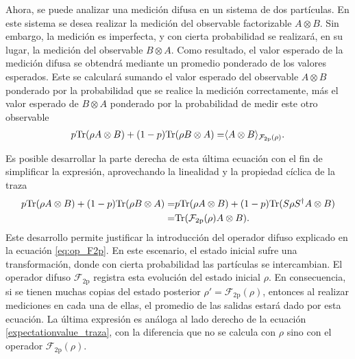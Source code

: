 

Ahora, se puede analizar una medición difusa en un sistema
de dos partículas. En este sistema se desea realizar la medición del observable factorizable $A\otimes B$. Sin embargo, la medición es imperfecta, y con cierta probabilidad se realizará, en su lugar, la medición del observable $B\otimes A$. Como resultado, el valor esperado de la medición difusa se obtendrá mediante un promedio ponderado de los valores esperados. Este se calculará sumando el valor esperado del observable $A\otimes B$ ponderado por la probabilidad que se realice la medición correctamente, más el valor esperado de $B\otimes A$ ponderado por la probabilidad de medir este otro observable {\cite{Pineda_2021}}\begin{equation}\label{eq:Expected-Value-FM-2p}
    \begin{split}
         p{\rm Tr}(\rho A\otimes B)+(1-p){\rm Tr}(\rho B\otimes A)=&\langle {A\otimes B}\rangle_{\mathcal{F}_{2\text{p}}(\rho)}.\\
    \end{split}
\end{equation}

%
Es posible desarrollar la parte derecha de esta última ecuación con el fin de simplificar la expresión, aprovechando la linealidad y la propiedad cíclica de la traza \begin{equation}\label{eq:Expected-Value-FM-2p-desarrollo}
    \begin{split}
         p{\rm Tr}(\rho A\otimes B)+(1-p){\rm Tr}(\rho B\otimes A)
        =&p{\rm Tr}(\rho A\otimes B)+(1-p){\rm Tr}(S\rho S^\dagger A\otimes B)\\
        =&{\rm Tr}(\mathcal{F}_{2\text{p}}(\rho)A\otimes B).\\
    \end{split}
\end{equation} Este desarrollo permite justificar la introducción del operador difuso explicado en la ecuación {\eqref{eq:op_F2p}}. En este escenario, el estado inicial sufre una transformación, donde  con cierta probabilidad las partículas se intercambian. El operador difuso $\mathcal{F}_{2\text{p}}$ registra esta evolución del estado inicial $\rho$. En consecuencia, si se tienen muchas copias del estado posterior $\rho'=\mathcal{F}_{2\text{p}}(\rho)$, entonces al realizar mediciones en cada una de ellas, el promedio de las salidas estará dado por esta ecuación.  La última expresión es análoga al lado derecho de la ecuación {\eqref{expectationvalue_traza}}, con la diferencia que no se calcula con $\rho$ sino con el operador $\mathcal{F}_{2\text{p}}(\rho)$.



